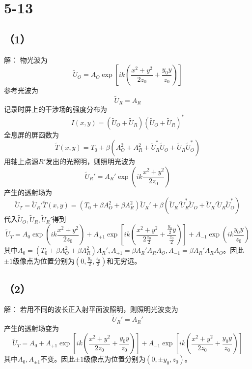 \documentclass[10pt,a4paper]{article}
\begin{document}
\section*{5-13}
\subsection*{（1）}解：
物光波为
\[
\widetilde{U}_O=A_O\exp[ik(\frac{x^2+y^2}{2z_0}+\frac{y_0y}{z_0})]
\]
参考光波为
\[
\widetilde{U}_R=A_R
\]
记录时屏上的干涉场的强度分布为
\[
I(x,y)=(\widetilde{U}_O+\widetilde{U}_R)(\widetilde{U}_O+\widetilde{U}_R)^*
\]
全息屏的屏函数为
\[
\widetilde{T}(x,y)=T_0+\beta(A_O^2+A_R^2+\widetilde{U}_R^*\widetilde{U}_O+\widetilde{U}_R\widetilde{U}_O^*)
\]
用轴上点源$R'$发出的光照明，则照明光波为
\[
\widetilde{U}_R'=A_R'\exp(ik\frac{x^2+y^2}{2z_0})
\]
产生的透射场为
\[
\widetilde{U}_T=\widetilde{U}_R'\widetilde{T}(x,y)=(T_0+\beta A_O^2+\beta A_R^2)\widetilde{U}_R'+\beta(\widetilde{U}_R'\widetilde{U}_R^*\widetilde{U}_O+\widetilde{U}_R'\widetilde{U}_R\widetilde{U}_O^*)
\]
代入$\widetilde{U}_O, \widetilde{U}_R, \widetilde{U}_R'$得到
\[
\widetilde{U}_T=A_0\exp(ik\frac{x^2+y^2}{2z_0})+A_{+1}\exp[ik(\frac{x^2+y^2}{2\frac{z_0}{2}}+\frac{\frac{y_0}{2}y}{\frac{z_0}{2}})]+A_{-1}\exp(ik\frac{y_0y}{z_0})
\]
其中$A_0=(T_0+\beta A_O^2+\beta A_R^2)A_R', A_{+1}=\beta A_R'A_RA_O, A_{-1}=\beta A_R'A_RA_O$。因此$\pm1$级像点为位置分别为$(0,\frac{y_0}{2},\frac{z_0}{2})$和无穷远。
\subsection*{（2）}解：
若用不同的波长正入射平面波照明，则照明光波变为
\[
\widetilde{U}_R'=A_R'
\]
产生的透射场变为
\[
\widetilde{U}_T=A_0+A_{+1}\exp[ik(\frac{x^2+y^2}{2z_0}+\frac{y_0y}{z_0})]+A_{-1}\exp[ik(\frac{x^2+y^2}{2z_0}+\frac{y_0y}{z_0})]
\]
其中$A_0,A_{\pm1}$不变。因此$\pm1$级像点为位置分别为$(0,\pm y_0,z_0)$。
\end{document}
